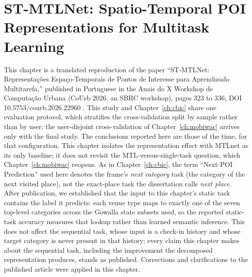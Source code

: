 \chapter[ST-MTLNet: Spatio-Temporal POI Representations]{ST-MTLNet: Spatio-Temporal POI Representations for Multitask Learning}
\label{ch:courb}

\begin{chapterpreface}
This chapter is a translated reproduction of the paper ``ST-MTLNet: Representações Espaço-Temporais de Pontos de Interesse para Aprendizado Multitarefa,'' published in Portuguese in the Anais do X Workshop de Computação Urbana (CoUrb 2026, an SBRC workshop), pages 323 to 336, DOI 10.5753/courb.2026.22960 \cite{paiva2026stmtlnet}. This study and Chapter~\ref{ch:cbic} share one evaluation protocol, which stratifies the cross-validation split by sample rather than by user; the user-disjoint cross-validation of Chapter~\ref{ch:mobiwac} arrives only with the final study. The conclusions reported here are those of the time, for that configuration. This chapter isolates the representation effect with MTLnet as its only baseline; it does not revisit the MTL-versus-single-task question, which Chapter~\ref{ch:mobiwac} reopens. As in Chapter~\ref{ch:cbic}, the term ``Next-POI Prediction'' used here denotes the frame's \emph{next category} task (the category of the next visited place), not the exact-place task the dissertation calls \emph{next place}. After publication, we established that the input to this chapter's static task contains the label it predicts: each venue type maps to exactly one of the seven top-level categories across the Gowalla state subsets used, so the reported static-task accuracy measures that lookup rather than learned semantic inference. This does not affect the sequential task, whose input is a check-in history and whose target category is never present in that history; every claim this chapter makes about the sequential task, including the improvement the decomposed representation produces, stands as published.
Corrections and clarifications to the published article were applied in this chapter.

\end{chapterpreface}
